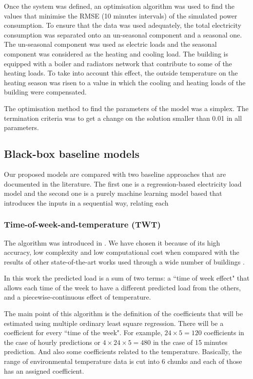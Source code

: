 \documentclass[10pt, conference, compsocconf]{IEEEtran}
\begin{document}
Once the system was defined, an optimisation algorithm was used to find the values that minimise the RMSE (10 minutes intervals) of the simulated power consumption. To ensure that the data was used adequately, the total electricity consumption was separated onto an un-seasonal component and a seasonal one. The un-seasonal component was used as electric loads and the seasonal component was considered as the heating and cooling load. The building is equipped with a boiler and radiators network that contribute to some of the heating loads. To take into account this effect, the outside temperature on the heating season was risen to a value in which the cooling and heating loads of the building were compensated.

The optimisation method to find the parameters of the model was a simplex. The termination criteria was to get a change on the solution smaller than 0.01 in all parameters. %

\subsection{Black-box baseline models}

Our proposed models are compared with two baseline approaches that are documented in the literature. The first one is a regression-based electricity load model and the second one is a purely machine learning model based that introduces the inputs in a sequential way, relating each 


\subsubsection{Time-of-week-and-temperature (TWT)}

The algorithm was introduced in \cite{mathieu2011quantifying}. We have chosen it because of its high accuracy, low complexity and low computational cost when compared with the results of other state-of-the-art works used through a wide number of buildings \cite{granderson2016accuracy}. 

In this work the predicted load is a sum of two terms: a ``time of week effect" that allows each time of the week to have a different predicted load from the others, and a piecewise-continuous effect of temperature. 

The main point of this algorithm is the definition of the coefficients that will be estimated using multiple ordinary least square regression. There will be a coefficient for every ``time of the week". For example, $24 \times 5 = 120$ coefficients in the case of hourly predictions or  $4\times 24 \times 5 = 480$ in the case of 15 minutes prediction. And also some coefficients related to the temperature. Basically, the range of environmental temperature data is cut into 6 chunks and each of those has an assigned coefficient.
\end{document}
